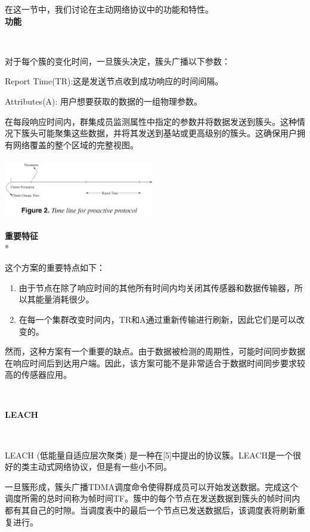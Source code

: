 \documentclass[journal]{IEEEtran}
\begin{document}
\begin{CJK}{UTF8}{gbsn}
在这一节中，我们讨论在主动网络协议中的功能和特性。
\\

\textbf{功能}

\

对于每个簇的变化时间，一旦簇头决定，簇头广播以下参数：

Report Time(TR):这是发送节点收到成功响应的时间间隔。

Attributes(A): 用户想要获取的数据的一组物理参数。

在每段响应时间内，群集成员监测属性中指定的参数并将数据发送到簇头。这种情况下簇头可能聚集这些数据，并将其发送到基站或更高级别的簇头。这确保用户拥有网络覆盖的整个区域的完整视图。 


\noindent
\includegraphics[height=100, width=250]{2.eps}

\textbf{重要特征}
\\*

这个方案的重要特点如下：
\\
\begin{enumerate}
 \setcounter{enumi}
 \item 由于节点在除了响应时间的其他所有时间内均关闭其传感器和数据传输器，所以其能量消耗很少。
 \item 在每一个集群改变时间内，TR和A通过重新传输进行刷新，因此它们是可以改变的。
 
\end{enumerate}

然而，这种方案有一个重要的缺点。由于数据被检测的周期性，可能时间同步数据在响应时间后到达用户端。因此，该方案可能不是非常适合于数据时间同步要求较高的传感器应用。

\

\textbf{LEACH}

\

LEACH (低能量自适应层次聚类) 是一种在[5]中提出的协议簇。LEACH是一个很好的类主动式网络协议，但是有一些小不同。

一旦簇形成，簇头广播TDMA调度命令使得群成员可以开始发送数据。完成这个调度所需的总时间称为帧时间TF。簇中的每个节点在发送数据到簇头的帧时间内都有其自己的时隙。当调度表中的最后一个节点已发送数据后，该调度表将刷新重复进行。


\end{CJK}
\end{document}
